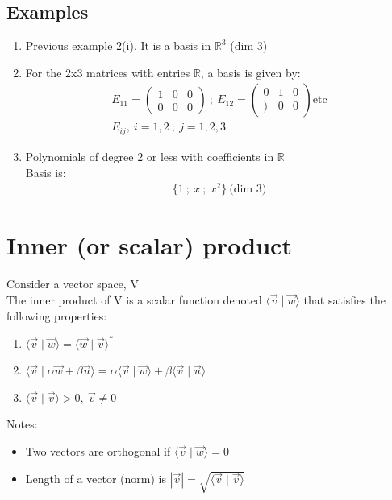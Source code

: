 \documentclass[a4paper, 11pt, normalem]{report}
\newcommand\R{\mathbb{R}}
\begin{document}
\subsection{Examples}
\begin{enumerate}
    \item Previous example 2(i). It is a basis in $\R^3$ (dim 3)
    \item For the 2x3 matrices with entries $\R$, a basis is given by:
            \begin{gather*}
                E_{11} =
                \begin{pmatrix}
                    1 & 0 & 0 \\
                    0 & 0 & 0
                \end{pmatrix} ~;~
                E_{12} =
                \begin{pmatrix}
                    0 & 1 & 0 \\
                    ) & 0 & 0
                \end{pmatrix} \text{etc} \\
                E_{ij},~ i = 1,2 ~;~ j = 1,2,3
            \end{gather*}
    \item Polynomials of degree 2 or less with coefficients in $\R$ \\
          Basis is:
            \begin{gather*}
                \Bigg\{1 ~;~ x ~;~ x^2 \Bigg\} ~\text{(dim 3)}
            \end{gather*}
\end{enumerate}

\section{Inner (or scalar) product}
Consider a vector space, V \\
The inner product of V is a scalar function denoted $\langle \vec{v} \mid \vec{w} \rangle$ that satisfies the following properties:
\begin{enumerate}
    \item $\langle \vec{v} \mid \vec{w} \rangle = \langle \vec{w} \mid \vec{v} \rangle^*$
    \item $\langle \vec{v} \mid \alpha\vec{w} + \beta\vec{u} \rangle = \alpha\langle \vec{v} \mid \vec{w} \rangle + \beta\langle \vec{v} \mid \vec{u} \rangle$
    \item $\langle \vec{v} \mid \vec{v} \rangle > 0,~ \vec{v} \neq 0$
\end{enumerate}
Notes:
\begin{itemize}
    \item Two vectors are orthogonal if $\langle \vec{v} \mid \vec{w} \rangle = 0$
    \item Length of a vector (norm) is $|\vec{v}| = \sqrt{\langle \vec{v} \mid \vec{v} \rangle}$
\end{itemize}
\end{document}
